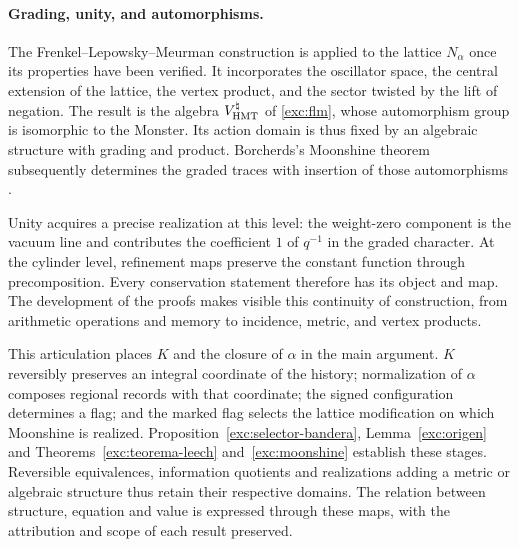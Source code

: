 \paragraph{Grading, unity, and automorphisms.}
\label{inc-ampl-automorfismos}
The Frenkel--Lepowsky--Meurman construction is applied to the lattice
$N_\alpha$ once its properties have been verified. It incorporates the oscillator
space, the central extension of the lattice, the vertex product,
and the sector twisted by the lift of negation. The result is
the algebra $V^\natural_{\rm HMT}$ of \eqref{exc:flm}, whose
automorphism group is isomorphic to the Monster. Its action domain is thus
fixed by an algebraic structure with grading and product. Borcherds's
Moonshine theorem subsequently determines the graded traces
with insertion of those automorphisms \cite{flm,borcherds}.

Unity acquires a precise realization at this level: the weight-zero
component is the vacuum line and contributes the coefficient $1$ of
$q^{-1}$ in the graded character. At the cylinder level,
refinement maps preserve the constant function through
precomposition. Every conservation statement therefore has its
object and map. The development of the proofs makes visible this
continuity of construction, from arithmetic operations and
memory to incidence, metric, and vertex products.

This articulation places $K$ and the closure of $\alpha$ in the main
argument. $K$ reversibly preserves an integral coordinate of the
history; normalization of $\alpha$ composes regional records
with that coordinate; the signed configuration determines a flag; and
the marked flag selects the lattice modification on which
Moonshine is realized. Proposition~\ref{exc:selector-bandera},
Lemma~\ref{exc:origen} and Theorems~\ref{exc:teorema-leech}
and~\ref{exc:moonshine} establish these stages. Reversible
equivalences, information quotients and realizations adding a metric
or algebraic structure thus retain their respective domains.
The relation between structure, equation and value is expressed through
these maps, with the attribution and scope of each result preserved.
